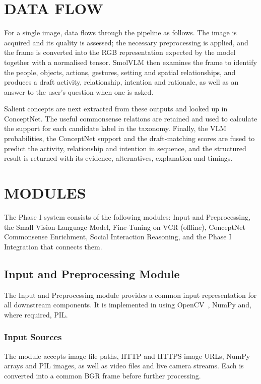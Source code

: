 \section{DATA FLOW}

For a single image, data flows through the pipeline as follows. The image is acquired and its quality is assessed; the necessary preprocessing is applied, and the frame is converted into the RGB representation expected by the model together with a normalised tensor. SmolVLM then examines the frame to identify the people, objects, actions, gestures, setting and spatial relationships, and produces a draft activity, relationship, intention and rationale, as well as an answer to the user's question when one is asked.

Salient concepts are next extracted from these outputs and looked up in ConceptNet. The useful commonsense relations are retained and used to calculate the support for each candidate label in the taxonomy. Finally, the VLM probabilities, the ConceptNet support and the draft-matching scores are fused to predict the activity, relationship and intention in sequence, and the structured result is returned with its evidence, alternatives, explanation and timings.

\section{MODULES}

The Phase I system consists of the following modules: Input and Preprocessing, the Small Vision-Language Model, Fine-Tuning on VCR (offline), ConceptNet Commonsense Enrichment, Social Interaction Reasoning, and the Phase I Integration that connects them.

\subsection{Input and Preprocessing Module}
\label{sec:preproc}

The Input and Preprocessing module provides a common input representation for all downstream components. It is implemented in  using OpenCV~\cite{bradski2000opencv}, NumPy and, where required, PIL.

\subsubsection{Input Sources}
The module accepts image file paths, HTTP and HTTPS image URLs, NumPy arrays and PIL images, as well as video files and live camera streams. Each is converted into a common BGR frame before further processing.

